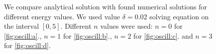 \documentclass{llncs}
\begin{document}
\begin{figure}
\begin{minipage}{.45\linewidth}
  \end{minipage}
  \begin{minipage}{.45\linewidth}
    \centering
  \end{minipage}
  \caption{We compare analytical solution with found numerical solutions for different energy values. We used value $\delta=0.02$ solving equation on the interval $[0,5]$. Different $n$ values were used:
    $n=0$ for \ref{fig:oscill:a}., $n=1$ for \ref{fig:oscill:b}., $n=2$ for \ref{fig:oscill:c}. and $n=3$ for \ref{fig:oscill:d}.}
\label{fig:oscill}
\end{figure}
\end{document}
